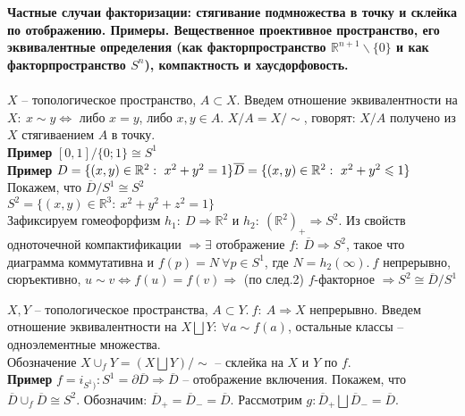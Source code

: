 \section{}
	\textbf{Частные случаи факторизации: стягивание подмножества в точку и склейка по отображению. Примеры. Вещественное проективное пространство, его эквивалентные определения (как факторпространство $\mathbb{R}^{n+1} \backslash \{0\}$ и как факторпространство $S^n$), компактность и хаусдорфовость.}\\
	\\
	$X$ -- топологическое пространство, $A \subset X$. Введем отношение эквивалентности на $X:\ x\sim y \Leftrightarrow$ либо $x = y$, либо $x, y \in A$. $X\slash A = X\slash \sim$, говорят: $X\slash A$ получено из $X$ стягиваением $A$ в точку.\\
	\textbf{Пример} $[0,1]\slash\{0;1\} \cong S^1$\\
	\textbf{Пример} $D=\{(x,y)\in \mathbb{R}^2:\ x^2+y^2=1\}\\
	\overline{D}=\{(x,y)\in \mathbb{R}^2:\ x^2 + y^2 \leqslant 1\}$\\
	Покажем, что $\overline{D}\slash S^1 \cong S^2$\\
	$S^2=\{(x,y)\in \mathbb{R}^3:\ x^2 + y^2 +z^2=1\}$\\
	Зафиксируем гомеофорфизм $h_1:\ D \Rightarrow \mathbb{R}^2$ и $h_2:\ {(\mathbb{R}^2)}_{+} \Rightarrow S^2$. Из свойств одноточечной компактификации $\Rightarrow \exists$ отображение $f:\ \overline{D} \Rightarrow S^2$, такое что диаграмма коммутативна и $f(p) = N\ \forall p \in S^1$, где $N=h_2(\infty).\ f$ непрерывно, сюръективно, $u \sim v \Leftrightarrow f(u) = f(v) \Rightarrow$ (по след.2) $f$-факторное $\Rightarrow S^2 \cong \overline{D}\slash S^1$\\
	\begin{figure}[h]
	\end{figure}
	$X,Y$ -- топологическое  пространства, $A\subset Y.\ f:\ A \Rightarrow X$ непрерывно. Введем отношение эквивалентности на $X \bigsqcup Y:\ \forall a\sim f(a)$, остальные классы -- одноэлементные множества. \\
	Обозначение $X {\cup}_{f} Y=(X \bigsqcup Y)\slash \sim$ -- склейка на $X$ и $Y$ по $f$.\\
	\textbf{Пример} $f = i_{S^1)}: S^1 = \partial \overline{D}\Rightarrow \overline{D}$ -- отображение включения. Покажем, что $\overline{D} {\cup}_{f} \overline{D} \cong S^2$.
	Обозначим: $\overline{D}_{+} = \overline{D}_{-} = \overline{D}$. Рассмотрим $g: \overline{D}_{+}\bigsqcup \overline{D}_{-}=\overline{D}$.\\

